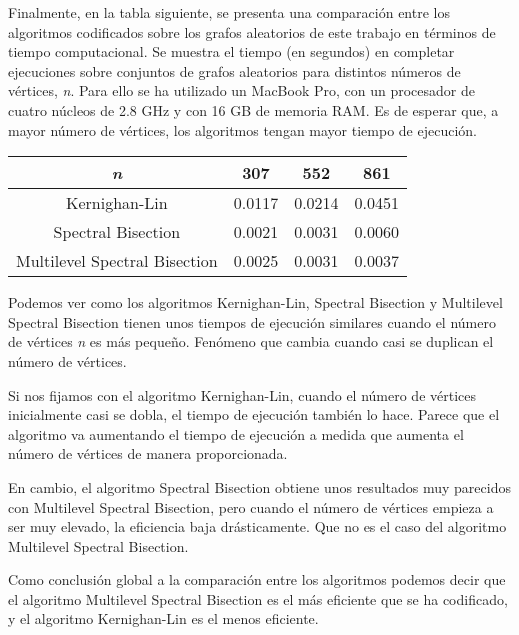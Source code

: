 Finalmente, en la tabla siguiente, se presenta una comparación entre los algoritmos codificados sobre los grafos aleatorios de este trabajo en términos de tiempo computacional. Se muestra el tiempo (en segundos) en completar ejecuciones sobre conjuntos de grafos aleatorios para distintos números de vértices, \textit{n}. Para ello se ha utilizado un MacBook Pro, con un procesador de cuatro núcleos de 2.8 GHz y con 16 GB de memoria RAM. Es de esperar que, a mayor número de vértices, los algoritmos tengan mayor tiempo de ejecución.

\begin{center}
	\begin{tabular}{|c|c|c|c|}
		\hline
		\textit{n} & 307 & 552 & 861 \\
		\hline
		Kernighan-Lin & 0.0117 & 0.0214 & 0.0451\\
		\hline
		Spectral Bisection & 0.0021 & 0.0031 & 0.0060 \\
		\hline
		Multilevel Spectral Bisection & 0.0025 & 0.0031 & 0.0037 \\ 
		\hline
	\end{tabular}
\end{center}

Podemos ver como los algoritmos Kernighan-Lin, Spectral Bisection y Multilevel Spectral Bisection tienen unos tiempos de ejecución similares cuando el número de vértices \textit{n} es más pequeño. Fenómeno que cambia cuando casi se duplican el número de vértices.

Si nos fijamos con el algoritmo Kernighan-Lin, cuando el número de vértices inicialmente casi se dobla, el tiempo de ejecución también lo hace. Parece que el algoritmo va aumentando el tiempo de ejecución a medida que aumenta el número de vértices de manera proporcionada.

En cambio, el algoritmo Spectral Bisection obtiene unos resultados muy parecidos con Multilevel Spectral Bisection, pero cuando el número de vértices empieza a ser muy elevado, la eficiencia baja drásticamente. Que no es el caso del algoritmo Multilevel Spectral Bisection.

Como conclusión global a la comparación entre los algoritmos podemos decir que el algoritmo Multilevel Spectral Bisection es el más eficiente que se ha codificado, y el algoritmo Kernighan-Lin es el menos eficiente.
